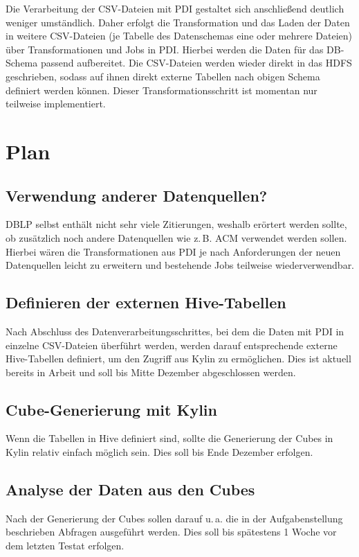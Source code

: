 \documentclass[a4paper,11pt,utf8]{scrartcl}
\begin{document}
Die Verarbeitung der CSV-Dateien mit PDI gestaltet sich anschließend deutlich weniger umständlich. Daher erfolgt die Transformation und das Laden der Daten in weitere CSV-Dateien (je Tabelle des Datenschemas eine oder mehrere Dateien) über Transformationen und Jobs in PDI. Hierbei werden die Daten für das DB-Schema passend aufbereitet. Die CSV-Dateien werden wieder direkt in das HDFS geschrieben, sodass auf ihnen direkt externe Tabellen nach obigen Schema definiert werden können. Dieser Transformationsschritt ist momentan nur teilweise implementiert.

\section{Plan}
\label{sec:plan}

\subsection{Verwendung anderer Datenquellen?}

DBLP selbst enthält nicht sehr viele Zitierungen, weshalb erörtert werden sollte, ob zusätzlich noch andere Datenquellen wie z.\,B. ACM verwendet werden sollen. Hierbei wären die Transformationen aus PDI je nach Anforderungen der neuen Datenquellen leicht zu erweitern und bestehende Jobs teilweise wiederverwendbar.

\subsection{Definieren der externen Hive-Tabellen}

Nach Abschluss des Datenverarbeitungsschrittes, bei dem die Daten mit PDI in einzelne CSV-Dateien überführt werden, werden darauf entsprechende externe Hive-Tabellen definiert, um den Zugriff aus Kylin zu ermöglichen. Dies ist aktuell bereits in Arbeit und soll bis Mitte Dezember abgeschlossen werden.  

\subsection{Cube-Generierung mit Kylin}

Wenn die Tabellen in Hive definiert sind, sollte die Generierung der Cubes in Kylin relativ einfach möglich sein. Dies soll bis Ende Dezember erfolgen.

\subsection{Analyse der Daten aus den Cubes}

Nach der Generierung der Cubes sollen darauf u.\,a. die in der Aufgabenstellung beschrieben Abfragen ausgeführt werden. Dies soll bis spätestens 1 Woche vor dem letzten Testat erfolgen.
\end{document}
